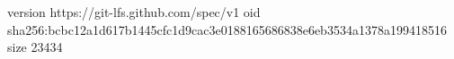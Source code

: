 version https://git-lfs.github.com/spec/v1
oid sha256:bcbc12a1d617b1445cfc1d9cac3e0188165686838e6eb3534a1378a199418516
size 23434
